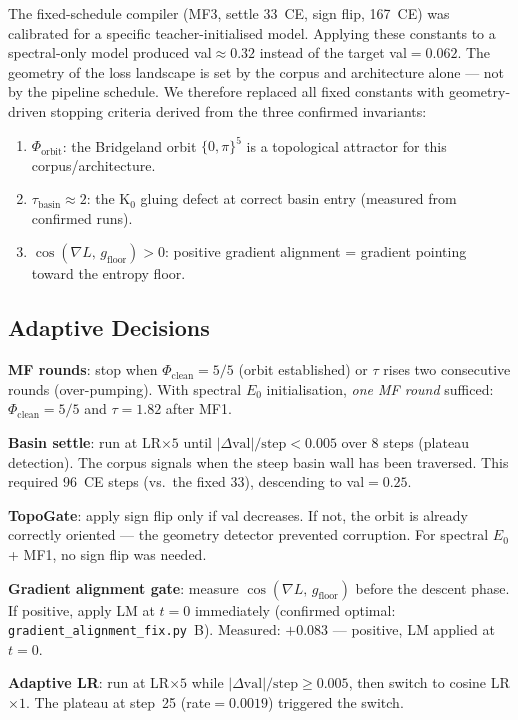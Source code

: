 \documentclass[11pt]{amsart}
\begin{document}
The fixed-schedule compiler (MF3, settle 33~CE, sign flip, 167~CE)
was calibrated for a specific teacher-initialised model.
Applying these constants to a spectral-only model produced val$\approx 0.32$
instead of the target val$=0.062$.
The geometry of the loss landscape is set by the corpus and architecture alone
--- not by the pipeline schedule.
We therefore replaced all fixed constants with geometry-driven stopping criteria
derived from the three confirmed invariants:
\begin{enumerate}
\item $\Phi_\mathrm{orbit}$: the Bridgeland orbit $\{0,\pi\}^5$
  is a topological attractor for this corpus/architecture.
\item $\tau_\mathrm{basin} \approx 2$: the K$_0$ gluing defect
  at correct basin entry (measured from confirmed runs).
\item $\cos(\nabla L,\, g_\mathrm{floor}) > 0$:
  positive gradient alignment = gradient pointing toward the entropy floor.
\end{enumerate}

\subsection{Adaptive Decisions}

\textbf{MF rounds}: stop when $\Phi_\mathrm{clean}=5/5$
(orbit established) or $\tau$ rises two consecutive rounds (over-pumping).
With spectral $E_0$ initialisation, \emph{one MF round} sufficed:
$\Phi_\mathrm{clean}=5/5$ and $\tau=1.82$ after MF1.

\textbf{Basin settle}: run at LR$\times 5$ until
$|\Delta\mathrm{val}|/\mathrm{step} < 0.005$ over 8 steps (plateau detection).
The corpus signals when the steep basin wall has been traversed.
This required 96~CE steps (vs.\ the fixed 33), descending to val$=0.25$.

\textbf{TopoGate}: apply sign flip only if val decreases.
If not, the orbit is already correctly oriented ---
the geometry detector prevented corruption.
For spectral $E_0$ + MF1, no sign flip was needed.

\textbf{Gradient alignment gate}: measure
$\cos(\nabla L,\, g_\mathrm{floor})$ before the descent phase.
If positive, apply LM at $t=0$ immediately
(confirmed optimal: \texttt{gradient\_alignment\_fix.py}~B).
Measured: $+0.083$ --- positive, LM applied at $t=0$.

\textbf{Adaptive LR}: run at LR$\times 5$ while
$|\Delta\mathrm{val}|/\mathrm{step} \geq 0.005$,
then switch to cosine LR$\times 1$.
The plateau at step~25 (rate$=0.0019$) triggered the switch.
\end{document}
